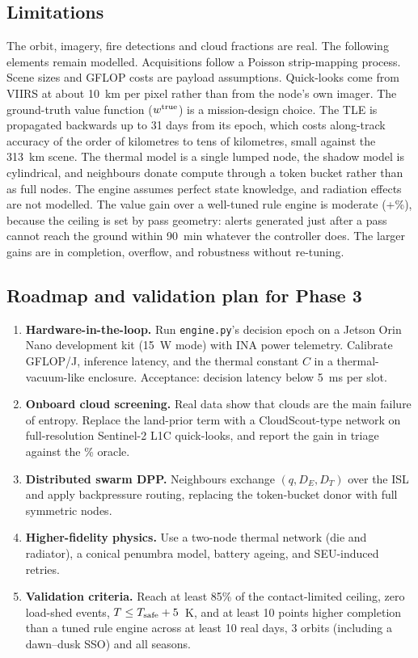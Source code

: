 

\subsection{Limitations}
The orbit, imagery, fire detections and cloud fractions are real. The following elements remain modelled. Acquisitions follow a Poisson strip-mapping process. Scene sizes and GFLOP costs are payload assumptions. Quick-looks come from VIIRS at about 10~km per pixel rather than from the node's own imager. The ground-truth value function ($w^{\rm true}$) is a mission-design choice. The TLE is propagated backwards up to 31 days from its epoch, which costs along-track accuracy of the order of kilometres to tens of kilometres, small against the 313~km scene. The thermal model is a single lumped node, the shadow model is cylindrical, and neighbours donate compute through a token bucket rather than as full nodes. The engine assumes perfect state knowledge, and radiation effects are not modelled. The value gain over a well-tuned rule engine is moderate (+\ELvalueGainRB\%), because the ceiling is set by pass geometry: alerts generated just after a pass cannot reach the ground within 90~min whatever the controller does. The larger gains are in completion, overflow, and robustness without re-tuning.

\subsection{Roadmap and validation plan for Phase 3}
\begin{enumerate}
\item \textbf{Hardware-in-the-loop.} Run \texttt{engine.py}'s decision epoch on a Jetson Orin Nano development kit (15~W mode) with INA power telemetry. Calibrate GFLOP/J, inference latency, and the thermal constant $C$ in a thermal-vacuum-like enclosure. Acceptance: decision latency below 5~ms per slot.
\item \textbf{Onboard cloud screening.} Real data show that clouds are the main failure of entropy. Replace the land-prior term with a CloudScout-type network on full-resolution Sentinel-2 L1C quick-looks, and report the gain in triage against the \CapOracle\% oracle.
\item \textbf{Distributed swarm DPP.} Neighbours exchange $(q,D_E,D_T)$ over the ISL and apply backpressure routing, replacing the token-bucket donor with full symmetric nodes.
\item \textbf{Higher-fidelity physics.} Use a two-node thermal network (die and radiator), a conical penumbra model, battery ageing, and SEU-induced retries.
\item \textbf{Validation criteria.} Reach at least 85\% of the contact-limited ceiling, zero load-shed events, $T\le T_{\rm safe}+5$~K, and at least 10 points higher completion than a tuned rule engine across at least 10 real days, 3 orbits (including a dawn--dusk SSO) and all seasons.
\end{enumerate}
